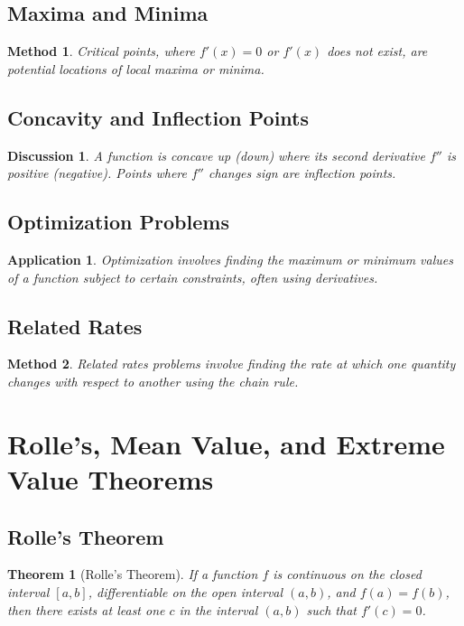 \documentclass[a4paper,12pt]{book}
\newcounter{problem}
\newtheorem{theorem}{Theorem}
\newtheorem{application}{Application}
\newtheorem{method}{Method}
\newtheorem{discussion}{Discussion}
\begin{document}
\subsection{Maxima and Minima}
\begin{method}
Critical points, where \( f'(x) = 0 \) or \( f'(x) \) does not exist, are potential locations of local maxima or minima.
\end{method}

\subsection{Concavity and Inflection Points}
\begin{discussion}
A function is concave up (down) where its second derivative \( f'' \) is positive (negative). Points where \( f'' \) changes sign are inflection points.
\end{discussion}

\subsection{Optimization Problems}
\begin{application}
Optimization involves finding the maximum or minimum values of a function subject to certain constraints, often using derivatives.
\end{application}

\subsection{Related Rates}
\begin{method}
Related rates problems involve finding the rate at which one quantity changes with respect to another using the chain rule.
\end{method}


\section{Rolle's, Mean Value, and Extreme Value Theorems}
\subsection{Rolle's Theorem}
\begin{theorem}[Rolle's Theorem]
If a function \( f \) is continuous on the closed interval \([a, b]\), differentiable on the open interval \((a, b)\), and \(f(a) = f(b)\), then there exists at least one \(c\) in the interval \((a, b)\) such that \(f'(c) = 0\).
\end{theorem}
\end{document}
